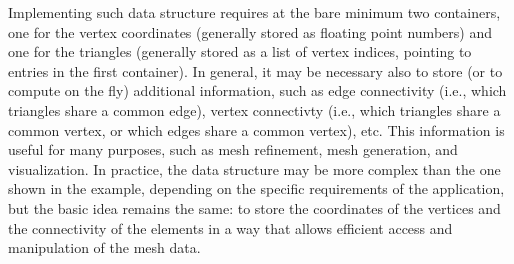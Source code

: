 Implementing such data structure requires at the bare minimum two containers,
one for the vertex coordinates (generally stored as floating point numbers) and
one for the triangles (generally stored as a list of vertex indices, pointing to
entries in the first container). In general, it may be necessary also to store
(or to compute on the fly) additional information, such as edge connectivity
(i.e., which triangles share a common edge), vertex connectivty (i.e., which
triangles share a common vertex, or which edges share a common vertex), etc.
This information is useful for many purposes, such as mesh refinement, mesh
generation, and visualization. In practice, the data structure may be more
complex than the one shown in the example, depending on the specific
requirements of the application, but the basic idea remains the same: to store
the coordinates of the vertices and the connectivity of the elements in a way
that allows efficient access and manipulation of the mesh data.
